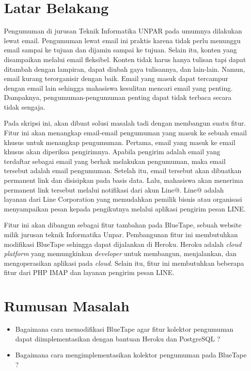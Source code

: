\documentclass[a4paper,twoside]{article}
\begin{document}
\section{Latar Belakang}
Pengumuman di jurusan Teknik Informatika UNPAR pada umumnya dilakukan lewat email. Pengumuman lewat email ini praktis karena tidak perlu menunggu email sampai ke tujuan dan dijamin sampai ke tujuan. Selain itu, konten yang disampaikan melalui email fleksibel. Konten tidak harus hanya tulisan tapi dapat ditambah dengan lampiran, dapat diubah gaya tulisannya, dan lain-lain. Namun, email kurang terorganisir dengan baik. Email yang masuk dapat tercampur dengan email lain sehingga mahasiswa kesulitan mencari email yang penting. Dampaknya, pengumuman-pengumuman penting dapat tidak terbaca secara tidak sengaja.

Pada skripsi ini, akan dibuat solusi masalah tadi dengan membangun suatu fitur. Fitur ini akan menangkap email-email pengumuman yang masuk ke sebuah email khusus untuk menangkap pengumuman. Pertama, email yang masuk ke email khusus akan diperiksa pengirimnya. Apabila pengirim adalah email yang terdaftar sebagai email yang berhak melakukan pengumuman, maka email tersebut adalah email pengumuman. Setelah itu, email tersebut akan dibuatkan permanent link dan disisipkan pada basis data. Lalu, mahasiswa akan menerima permanent link tersebut melalui notifikasi dari akun Line@. Line@ adalah layanan dari Line Corporation yang memudahkan pemilik bisnis atau organisasi menyampaikan pesan kepada pengikutnya melalui aplikasi pengirim pesan LINE.

Fitur ini akan dibangun sebagai fitur tambahan pada BlueTape, sebuah website milik jurusan teknik Informatika Unpar. Pembangunan fitur ini membutuhkan modifikasi BlueTape sehingga dapat dijalankan di Heroku. Heroku adalah \textit{cloud platform} yang memungkinkan \textit{developer} untuk membangun, menjalankan, dan mengoperasikan aplikasi pada \textit{cloud}. Selain itu, fitur ini membutuhkan beberapa fitur dari PHP IMAP dan layanan pengirim pesan LINE.

\section{Rumusan Masalah}
\begin{itemize}
\item Bagaimana cara memodifikasi BlueTape agar fitur kolektor pengumuman dapat diimplementasikan dengan bantuan Heroku dan PostgreSQL ?
\item Bagaimana cara mengimplementasikan kolektor pengumuman pada BlueTape ?
\end{itemize}
\end{document}
